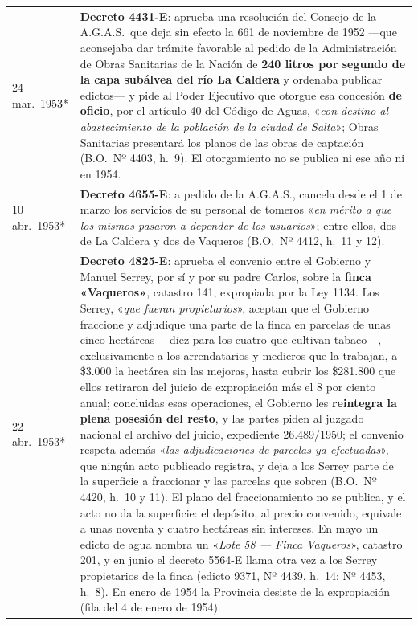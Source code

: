 \begin{longtable}{@{}p{2.7cm}p{10.3cm}@{}}
24 mar.\ 1953* & \textbf{Decreto 4431-E}: aprueba una resolución del Consejo de la A.G.A.S.\ que deja sin efecto la 661 de noviembre de 1952 ---que aconsejaba dar trámite favorable al pedido de la Administración de Obras Sanitarias de la Nación de \textbf{240 litros por segundo de la capa subálvea del río La Caldera} y ordenaba publicar edictos--- y pide al Poder Ejecutivo que otorgue esa concesión \textbf{de oficio}, por el artículo 40 del Código de Aguas, «\textit{con destino al abastecimiento de la población de la ciudad de Salta}»; Obras Sanitarias presentará los planos de las obras de captación (B.O.\ Nº 4403, h.\ 9). El otorgamiento no se publica ni ese año ni en 1954. \\
10 abr.\ 1953* & \textbf{Decreto 4655-E}: a pedido de la A.G.A.S., cancela desde el 1 de marzo los servicios de su personal de tomeros «\textit{en mérito a que los mismos pasaron a depender de los usuarios}»; entre ellos, dos de La Caldera y dos de Vaqueros (B.O.\ Nº 4412, h.\ 11 y 12). \\
22 abr.\ 1953* & \textbf{Decreto 4825-E}: aprueba el convenio entre el Gobierno y Manuel Serrey\index{Serrey, Manuel}, por sí y por su padre Carlos\index{Serrey, Carlos}, sobre la \textbf{finca «Vaqueros»}, catastro 141, expropiada por la Ley 1134. Los Serrey, «\textit{que fueran propietarios}», aceptan que el Gobierno fraccione y adjudique una parte de la finca en parcelas de unas cinco hectáreas ---diez para los cuatro que cultivan tabaco---, exclusivamente a los arrendatarios y medieros que la trabajan, a \$3.000 la hectárea sin las mejoras, hasta cubrir los \$281.800 que ellos retiraron del juicio de expropiación más el 8 por ciento anual; concluidas esas operaciones, el Gobierno les \textbf{reintegra la plena posesión del resto}, y las partes piden al juzgado nacional el archivo del juicio, expediente 26.489/1950; el convenio respeta además «\textit{las adjudicaciones de parcelas ya efectuadas}», que ningún acto publicado registra, y deja a los Serrey parte de la superficie a fraccionar y las parcelas que sobren (B.O.\ Nº 4420, h.\ 10 y 11). El plano del fraccionamiento no se publica, y el acto no da la superficie: el depósito, al precio convenido, equivale a unas noventa y cuatro hectáreas sin intereses. En mayo un edicto de agua nombra un «\textit{Lote 58 --- Finca Vaqueros}», catastro 201, y en junio el decreto 5564-E llama otra vez a los Serrey propietarios de la finca (edicto 9371, Nº 4439, h.\ 14; Nº 4453, h.\ 8). En enero de 1954 la Provincia desiste de la expropiación (fila del 4 de enero de 1954). \\

\end{longtable}
